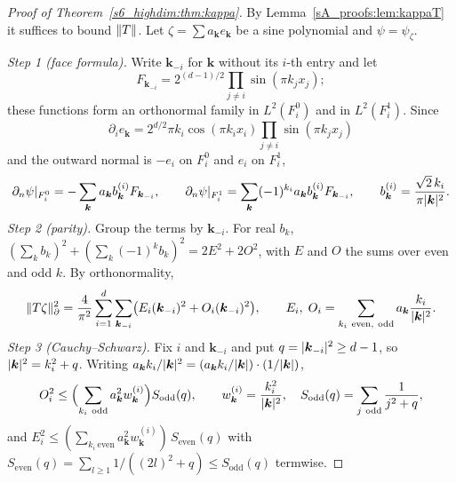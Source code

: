 \begin{proof}[Proof of Theorem~\ref{s6_highdim:thm:kappa}]
By Lemma~\ref{sA_proofs:lem:kappaT} it suffices to bound $\lVert T\rVert$. Let
$\zeta=\sum a_{\boldsymbol k}e_{\boldsymbol k}$ be a sine polynomial and $\psi=\psi_\zeta$.

\emph{Step 1 (face formula).} Write $\boldsymbol k_{-i}$ for $\boldsymbol k$ without its $i$-th
entry and let
\[
F_{\boldsymbol k_{-i}}=2^{(d-1)/2}\prod_{j\ne i}\sin(\pi k_jx_j);
\]
these functions form an orthonormal family in $L^2(F_i^0)$ and in $L^2(F_i^1)$. Since
\[
\partial_ie_{\boldsymbol k}=2^{d/2}\pi k_i\cos(\pi k_ix_i)\prod_{j\ne i}\sin(\pi k_jx_j)
\]
and the
outward normal is $-e_i$ on $F_i^0$ and $e_i$ on $F_i^1$,
\[
\partial_n\psi|_{F_i^0}=-\sum_{\boldsymbol k}a_{\boldsymbol k}b_{\boldsymbol k}^{(i)}F_{\boldsymbol k_{-i}},\qquad
\partial_n\psi|_{F_i^1}=\sum_{\boldsymbol k}(-1)^{k_i}a_{\boldsymbol k}b_{\boldsymbol k}^{(i)}F_{\boldsymbol k_{-i}},\qquad
b_{\boldsymbol k}^{(i)}=\frac{\sqrt2\,k_i}{\pi\lvert \boldsymbol k\rvert^2}.
\]
\emph{Step 2 (parity).} Group the terms by $\boldsymbol k_{-i}$. For real $b_k$,
$(\sum_kb_k)^2+(\sum_k(-1)^kb_k)^2=2E^2+2O^2$, with $E$ and $O$ the sums over even and odd $k$. By
orthonormality,
\begin{equation}\label{sA_proofs:eq:TT}
\lVert T\zeta\rVert_{\partial}^2=\frac4{\pi^2}\sum_{i=1}^d\sum_{\boldsymbol k_{-i}}\bigl(E_i(\boldsymbol k_{-i})^2+O_i(\boldsymbol k_{-i})^2\bigr),
\qquad
E_i,\;O_i=\sum_{k_i\ \mathrm{even},\ \mathrm{odd}}a_{\boldsymbol k}\frac{k_i}{\lvert \boldsymbol k\rvert^2}.
\end{equation}
\emph{Step 3 (Cauchy--Schwarz).} Fix $i$ and $\boldsymbol k_{-i}$ and put $q=\lvert \boldsymbol k_{-i}\rvert^2\ge d-1$,
so $\lvert \boldsymbol k\rvert^2=k_i^2+q$. Writing
$a_{\boldsymbol k}k_i/\lvert \boldsymbol k\rvert^2=(a_{\boldsymbol k}k_i/\lvert \boldsymbol k\rvert)\cdot(1/\lvert \boldsymbol k\rvert)$,
\[
O_i^2\le\Bigl(\sum_{k_i\ \mathrm{odd}}a_{\boldsymbol k}^2w^{(i)}_{\boldsymbol k}\Bigr)S_{\mathrm{odd}}(q),\qquad
w^{(i)}_{\boldsymbol k}=\frac{k_i^2}{\abs{\boldsymbol k}^2},\quad
S_{\mathrm{odd}}(q)=\sum_{j\ \mathrm{odd}}\frac1{j^2+q},
\]
and $E_i^2\le(\sum_{k_i\ \mathrm{even}}a_{\boldsymbol k}^2w^{(i)}_{\boldsymbol k})\,S_{\mathrm{even}}(q)$
with $S_{\mathrm{even}}(q)=\sum_{l\ge1}1/((2l)^2+q)\le S_{\mathrm{odd}}(q)$ termwise.

\end{proof}
